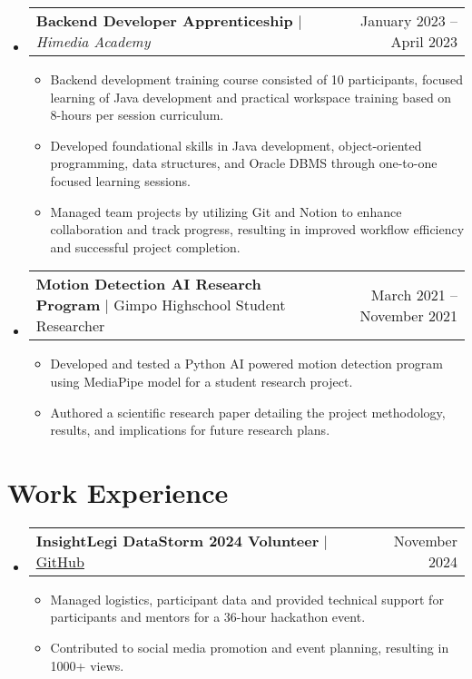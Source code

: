 \documentclass[letterpaper,11pt]{article}
\makeatletter
\newcommand{\resumeItem}[1]{
  \item\small{
    {#1 \vspace{-3pt}}
  }
}
\newcommand{\resumeProjectHeading}[2]{
    \item
    \begin{tabular*}{0.97\textwidth}{l@{\extracolsep{\fill}}r@{\hspace{-0.2in}}}
        \small#1 & #2 \\
    \end{tabular*}\vspace{-7pt}
}
\newcommand{\resumeSubHeadingListStart}{\begin{itemize}[leftmargin=0.00in, rightmargin=-0.2in, label={}]}
\newcommand{\resumeSubHeadingListEnd}{\end{itemize}}
\newcommand{\resumeItemListStart}{\begin{itemize}[leftmargin=0.15in, rightmargin=0.15in]}
\newcommand{\resumeItemListEnd}{\end{itemize}\vspace{-7pt}}
\makeatother
\begin{document}
    \resumeSubHeadingListStart
        \resumeProjectHeading
            {\textbf{Backend Developer Apprenticeship} $|$ \emph{Himedia Academy}}{January 2023 -- April 2023}
            \resumeItemListStart
                \resumeItem{Backend development training course consisted of 10 participants, focused learning of Java development and practical workspace training based on 8-hours per session curriculum.}
                \resumeItem{Developed foundational skills in Java development, object-oriented programming, data structures, and Oracle DBMS through one-to-one focused learning sessions.}
                \resumeItem{Managed team projects by utilizing Git and Notion to enhance collaboration and track progress, resulting in improved workflow efficiency and successful project completion.}
                \resumeItemListEnd
        \resumeSubHeadingListEnd

    \resumeSubHeadingListStart
        \resumeProjectHeading
            {\textbf{Motion Detection AI Research Program} $|$ Gimpo Highschool Student Researcher}{March 2021 -- November 2021}
            \resumeItemListStart
                \resumeItem{Developed and tested a Python AI powered motion detection program using MediaPipe model for a student research project.}
                \resumeItem{Authored a scientific research paper detailing the project methodology, results, and implications for future research plans.}
            \resumeItemListEnd
        \resumeSubHeadingListEnd

    \vspace{-1pt}

\section{Work Experience}
    \vspace{-3pt}
    \resumeSubHeadingListStart
        \resumeProjectHeading
            {\textbf{InsightLegi DataStorm 2024 Volunteer} $|$ \href{https://github.com/juhun32/Prison-Break}{\underline{GitHub}}}{November 2024}
            \resumeItemListStart
                \resumeItem{Managed logistics, participant data and provided technical support for participants and mentors for a 36-hour hackathon event.}
                \resumeItem{Contributed to social media promotion and event planning, resulting in 1000+ views.}
                \resumeItemListEnd
        \resumeSubHeadingListEnd
\end{document}

